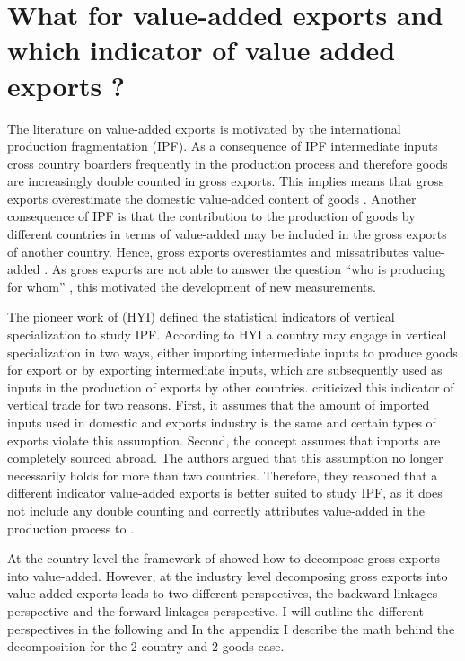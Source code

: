 \section{What for value-added exports and which indicator of value added exports ?} \label{sec:vax} 
The literature on value-added exports is motivated by the international production fragmentation (IPF). As a consequence of IPF  intermediate inputs cross country boarders frequently in the production process and therefore goods are increasingly double counted in gross exports. This implies means that gross exports overestimate the domestic value-added content of goods \parencite{johnson}. Another consequence of IPF is that the contribution to the production of goods by different countries in terms of value-added may be included in the gross exports of another country. Hence, gross exports overestiamtes and missatributes value-added . As gross exports are not able to answer the question ``who is producing for whom'' \textcite{daudin}, this motivated the development of new measurements. \par    
The pioneer work of \textcite{Hummels} (HYI) defined the statistical indicators of vertical specialization to study IPF.  According to HYI a country may engage in vertical specialization in two ways, either importing intermediate inputs to produce goods for export or by exporting intermediate inputs, which are subsequently used as inputs in the production of exports by other countries.  \textcite{Koopman} criticized this indicator of vertical trade for two reasons. First, it assumes that the amount of imported inputs used in domestic and exports industry is the same and certain types of exports violate this assumption. Second, the concept assumes that imports are completely sourced abroad. The authors argued that this assumption no longer necessarily holds for more than two countries. Therefore, they reasoned that a different indicator value-added exports is better suited to study IPF, as it does not include any double counting and correctly attributes value-added in the production process to . %
\par
At the country level the framework of \textcite{Koopman} showed how to decompose gross exports into value-added. However, at the industry level decomposing gross exports into value-added exports leads to two different perspectives, the backward linkages perspective and the forward linkages perspective\textcite{wang2013}.  I will outline the different perspectives in the following and In the appendix I describe the math behind the decomposition for the 2 country and 2 goods case. \par 
